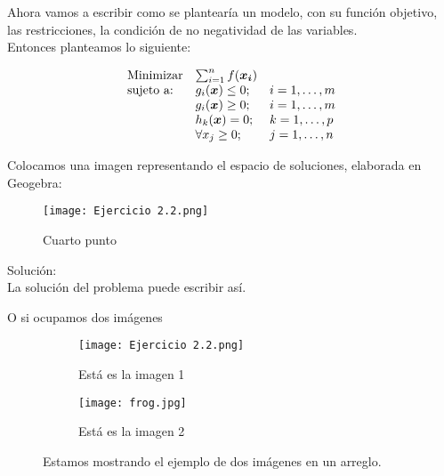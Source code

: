 \documentclass[12pt]{article}
\begin{document}
Ahora vamos a escribir como se plantearía un modelo, con su función objetivo, las restricciones, la condición de no negatividad de las variables.\\ %
Entonces planteamos lo siguiente:

\begin{equation*}
\begin{array}{lll}
    \mbox{Minimizar}
    & \sum_{i=1}^{n}f(\mbox{\boldmath{$x_i$}}) &\\
    \mbox{sujeto a: }
    & g_i(\mbox{\boldmath{$x$}}) \leq 0; &
    i=1,\ldots,m\\
    & g_i(\mbox{\boldmath{$x$}}) \geq 0; &
    i=1,\ldots,m\\
    & h_k(\mbox{\boldmath{$x$}}) = 0; &
    k=1,\ldots,p\\
    & \forall x_j \geq 0; & j=1,\ldots,n
    \end{array}
\end{equation*}

Colocamos una imagen representando el espacio de soluciones, elaborada en Geogebra:

\begin{figure}[ht] %
\centering
\texttt{[image: Ejercicio 2.2.png]}
\caption{Cuarto punto}
\label{cuarta}
\end{figure}


{\color{red}Solución: }\\
La solución del problema puede escribir así.

O si ocupamos dos imágenes

\begin{figure}[ht] %
\centering
    \begin{subfigure}[h]{0.45\textwidth} %
        \centering
        \texttt{[image: Ejercicio 2.2.png]}
        \caption {Está es la imagen 1}
        \label{fig: imagen 1}
    \end{subfigure}
    \hspace{0.1cm} %
    \begin{subfigure}[h]{0.45\textwidth} %
        \centering
        \texttt{[image: frog.jpg]}
        \caption {Está es la imagen 2}
        \label{fig: imagen 2}
    \end{subfigure}
 \caption{Estamos mostrando el ejemplo de dos imágenes en un arreglo.}
 \label{dos imágenes}
\end{figure}
\end{document}

